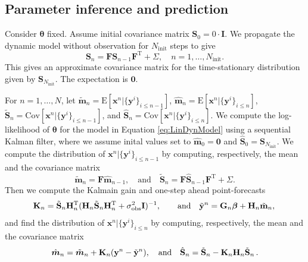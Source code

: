 \documentclass[12pt]{article} %
\begin{document}
\subsection{Parameter inference and prediction}
\label{sec:HierParInf}
Consider $\boldsymbol{\theta}$ fixed.
Assume initial covariance matrix $\mathbf{S}_0 = 0\cdot \mathbf{I}$. We propagate the dynamic model without observation for $N_{\mathrm{init}}$ steps to give
\[
    \mathbf{S}_n = \mathbf{F}\mathbf{S}_{n-1}\mathbf{F}^\mathrm{T} + \Sigma, \quad n = 1, \ldots, N_{\mathrm{init}}.
\]
This gives an approximate covariance matrix for the time-stationary
distribution given by $\mathbf{S}_{N_{\mathrm{init}}}$. The expectation is $\boldsymbol{0}$.

For $n = 1, \ldots, N$,  let $\tilde{\boldsymbol{m}}_n = \mathrm{E}[\boldsymbol{x}^n|\{\boldsymbol{y}^i\}_{i\leq n-1}]$, $\hat{\boldsymbol{m}}_n = \mathrm{E}[\boldsymbol{x}^n|\{\boldsymbol{y}^i\}_{i\leq n}]$, $\tilde{\mathbf{S}}_n = \mathrm{Cov}[\boldsymbol{x}^n|\{\boldsymbol{y}^i\}_{i\leq n-1}]$, and $\hat{\mathbf{S}}_n = \mathrm{Cov}[\boldsymbol{x}^n|\{\boldsymbol{y}^i\}_{i\leq n}]$. We compute the log-likelihood of $\boldsymbol{\theta}$ for the model in Equation \eqref{eq:LinDynModel} using a sequential Kalman filter, where we assume inital values set to
$\hat{\boldsymbol{m}}_0 = \boldsymbol{0}$ and $\hat{\mathbf{S}}_0 = \mathbf{S}_{N_{\mathrm{init}}}$.
We compute the distribution of $\boldsymbol{x}^n|\{\boldsymbol{y}^i\}_{i\leq n-1}$ by computing, respectively, the mean and
the covariance matrix
\[
    \tilde{\boldsymbol{m}}_n = \mathbf{F}\hat{\boldsymbol{m}}_{n-1}, \quad \text{and}\quad \tilde{\mathbf{S}}_{n} = \mathbf{F}\hat{\mathbf{S}}_{n-1}\mathbf{F}^\mathrm{T} + \Sigma.
\]
Then we compute the Kalmain gain and one-step ahead point-forecasts
\begin{equation*}
    \mathbf{K}_n = \Tilde{\mathbf{S}}_n \mathbf{H}_n^\mathrm{T}(\mathbf{H}_n\tilde{\mathbf{S}}_n\mathbf{H}_n^\mathrm{T}+\sigma_{\mathrm{obs}}^2\mathbf{I})^{-1}, \quad \quad\text{and}\quad
    \tilde{\mathbf{y}}^n = \mathbf{G}_n\boldsymbol{\beta} + \mathbf{H}_n \tilde{\mathbf{m}}_n, \,
\end{equation*}
and find the distribution of $\boldsymbol{x}^n|\{\boldsymbol{y}^i\}_{i\leq n}$ by computing, respectively, the mean and the covariance matrix
\begin{equation*}
    \hat{\boldsymbol{m}}_n = \Tilde{\boldsymbol{m}}_n + \mathbf{K}_n (\mathbf{y}^n - \tilde{\mathbf{y}}^n), \quad \text{and}\quad
    \Hat{\mathbf{S}}_n = \Tilde{\mathbf{S}}_n - \mathbf{K}_n \mathbf{H}_n \Tilde{\mathbf{S}}_n \, .
\end{equation*}
\end{document}
